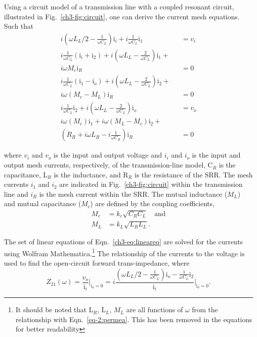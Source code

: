 Using a circuit model of a transmission line with a coupled resonant circuit, illustrated in Fig.~\ref{ch3-fig:circuit}, one can derive the current mesh equations. Such that
\begin{subequations}
\begin{eqnarray}
i(\omega L_L/2 - \frac{1}{\omega C_L}) \text{i}_i +  i\frac{1}{\omega C_L} \text{i}_1 &= v_i  \\
i\frac{1}{\omega C_L} (\text{i}_{i}+\text{i}_2) + i(\omega L_L - \frac{2}{\omega C_L}) \text{i}_{1} + \nonumber \\
 i \omega M_c \text{i}_R &= 0  \\
i\frac{1}{\omega C_L} (\text{i}_{1}-\text{i}_{o}) + i(\omega L_L - \frac{2}{\omega C_L}) \text{i}_{2} + \nonumber \\
i \omega (M_c - M_L) \text{i}_R &= 0  \\
i \frac{1}{\omega C_L} \text{i}_{2} + i(\omega L_L - \frac{2}{\omega C_L}) \text{i}_{o}  &= v_o  \\
i \omega (M_c) \text{i}_{1} + i \omega (M_L - M_c)\text{i}_2 + \qquad \nonumber \\ 
(R_R + i \omega L_R - i\frac{1}{\omega C_R}) \text{i}_R  &= 0
\end{eqnarray}\label{ch3-eq:lineareq}
\end{subequations}

\noindent 
where $v_i$ and $v_o$ is the input and output voltage and $i_i$ and $i_o$ is the input and output mesh currents, respectively, of the transmission-line model, C$_R$ is the capacitance, L$_R$ is the inductance, and R$_R$ is the resistance of the SRR. The mesh currents $i_1$ and $i_2$ are indicated in Fig.~\ref{ch3-fig:circuit} within the transmission line and $i_R$ is the mesh current within the SRR. The mutual inductance ($M_L$) and mutual capacitance ($M_c$) are defined by the coupling coefficients, 
\begin{subequations}
\begin{eqnarray}
    M_c &= k_c \sqrt{C_R C_L}\quad \text{and} \\
    M_L &= k_L \sqrt{L_R L_L}.
\end{eqnarray}
\end{subequations}

The set of linear equations of Eqn.~\ref{ch3-eq:lineareq} are solved for the currents using Wolfram Mathematica.\footnote{It should be noted that L$_R$, L$_L$, $M_L$ are all functions of $\omega$ from the relationship with Eqn.~\ref{eq-2:permea}. This has been removed in the equations for better readability} The relationship of the currents to the voltage is used to find the open-circuit forward trans-impedance, where
\begin{equation}
    Z_{21}(\omega) = \frac{v_o}{\text{i}_i} \Biggr\rvert_{\text{i}_o=0} =i \frac{(\omega L_L/2 - \frac{1}{\omega C_L}) \text{i}_o - \frac{1}{\omega C_L} \text{i}_2  }{\text{i}_i} \Biggr\rvert_{\text{i}_o=0}.
\end{equation}

